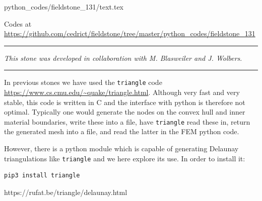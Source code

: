 \begin{flushright} {\tiny {\color{gray} python\_codes/fieldstone\_131/text.tex}} \end{flushright}

%

\begin{center}

Codes at \url{https://github.com/cedrict/fieldstone/tree/master/python_codes/fieldstone_131}
\end{center}

\par\noindent\rule{\textwidth}{0.4pt}

{\sl This stone was developed in collaboration with M. Blasweiler and J. Wolbers}. 

\par\noindent\rule{\textwidth}{0.4pt}

In previous stones we have used the {\tt triangle} code \url{https://www.cs.cmu.edu/~quake/triangle.html}.
Although very fast and very stable, this code is written in C and the interface with python 
is therefore not optimal. Typically one would generate the nodes on the convex hull and inner 
material boundaries, write these into a file, have {\tt triangle} read these in, return the 
generated mesh into a file, and read the latter in the FEM python code. 

However, there is a python module which is capable of generating Delaunay triangulations like {\tt triangle}
and we here explore its use. In order to install it:
\begin{verbatim}
pip3 install triangle
\end{verbatim}

https://rufat.be/triangle/delaunay.html


